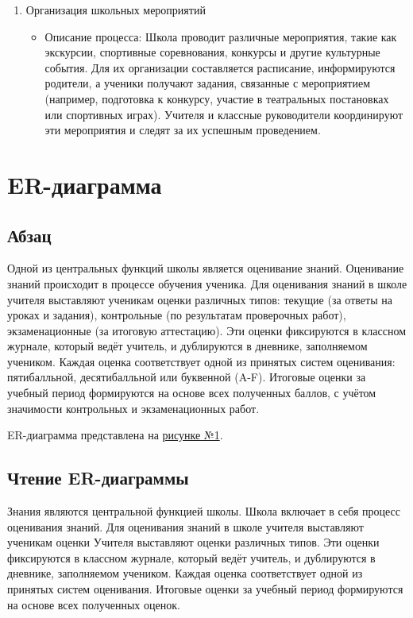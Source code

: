 \documentclass[a4paper, final]{article}
\begin{document}
\begin{enumerate}
  \item Организация школьных мероприятий
  \begin{itemize}
    \item Описание процесса: Школа проводит различные мероприятия, такие как экскурсии, спортивные соревнования, конкурсы и другие культурные события. Для их организации составляется расписание, информируются родители, а ученики получают задания, связанные с мероприятием (например, подготовка к конкурсу, участие в театральных постановках или спортивных играх). Учителя и классные руководители координируют эти мероприятия и следят за их успешным проведением.
  \end{itemize}
\end{enumerate}


\newpage
\section{ER-диаграмма}
\subsection{Абзац}
Одной из центральных функций школы является оценивание знаний. Оценивание знаний происходит в процессе обучения ученика. Для оценивания знаний в школе учителя выставляют ученикам оценки различных типов: текущие (за ответы на уроках и задания), контрольные (по результатам проверочных работ), экзаменационные (за итоговую аттестацию). Эти оценки фиксируются в классном журнале, который ведёт учитель, и дублируются в дневнике, заполняемом учеником. Каждая оценка соответствует одной из принятых систем оценивания: пятибалльной, десятибалльной или буквенной (A-F). Итоговые оценки за учебный период формируются на основе всех полученных баллов, с учётом значимости контрольных и экзаменационных работ.


ER-диаграмма представлена на \hyperlink{diag:er}{рисунке №1}.

\newpage
\hypertarget{diag:er}{}

\addtocounter{figure}{1}
\newpage

\subsection{Чтение ER-диаграммы}
Знания являются центральной функцией школы. Школа включает в себя процесс оценивания знаний. Для оценивания знаний в школе учителя выставляют ученикам оценки Учителя выставляют оценки различных типов. Эти оценки фиксируются в классном журнале, который ведёт учитель, и дублируются в дневнике, заполняемом учеником. Каждая оценка соответствует одной из принятых систем оценивания. Итоговые оценки за учебный период формируются на основе всех полученных оценок.
\end{document}
